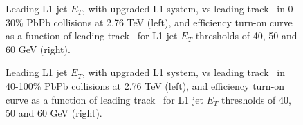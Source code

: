 \begin{figure}[!ht]
\begin{center}
\caption{Leading L1 jet $E_T$, with upgraded L1 system, vs leading track
\pt\ in 0-30\% PbPb collisions
at 2.76 TeV (left), and efficiency turn-on curve as a function of leading
track \pt\ for L1 jet $E_T$
thresholds of 40, 50 and 60 GeV (right).}
\label{fig:trigEff_track2015_central}
\end{center}
\end{figure}

\begin{figure}[!ht]
\begin{center}
\caption{Leading L1 jet $E_T$, with upgraded L1 system, vs leading track
\pt\ in 40-100\% PbPb collisions
at 2.76 TeV (left), and efficiency turn-on curve as a function of leading
track \pt\ for L1 jet $E_T$
thresholds of 40, 50 and 60 GeV (right).}
\label{fig:trigEff_track2015_peripheral}
\end{center}
\end{figure}
